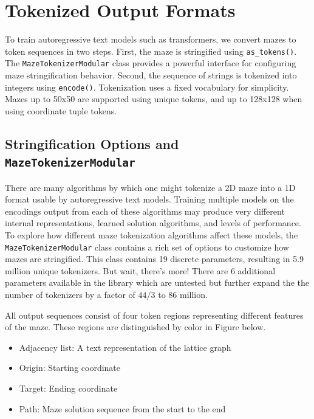 \documentclass[10pt,a4paper,onecolumn]{article}
\providecommand{\tightlist}{%
  \setlength{\itemsep}{0pt}\setlength{\parskip}{0pt}}
\begin{document}
\hypertarget{tokenized-output-formats}{%
\section{Tokenized Output Formats}\label{tokenized-output-formats}}

To train autoregressive text models such as transformers, we convert
mazes to token sequences in two steps. First, the maze is stringified
using \texttt{as\_tokens()}. The \texttt{MazeTokenizerModular} class
provides a powerful interface for configuring maze stringification
behavior. Second, the sequence of strings is tokenized into integers
using \texttt{encode()}. Tokenization uses a fixed vocabulary for
simplicity. Mazes up to 50x50 are supported using unique tokens, and up
to 128x128 when using coordinate tuple tokens.

\hypertarget{mtm}{%
\subsection{\texorpdfstring{Stringification Options and
\texttt{MazeTokenizerModular}}{Stringification Options and MazeTokenizerModular}}\label{mtm}}

There are many algorithms by which one might tokenize a 2D maze into a
1D format usable by autoregressive text models. Training multiple models
on the encodings output from each of these algorithms may produce very
different internal representations, learned solution algorithms, and
levels of performance. To explore how different maze tokenization
algorithms affect these models, the \texttt{MazeTokenizerModular} class
contains a rich set of options to customize how mazes are stringified.
This class contains 19 discrete parameters, resulting in 5.9 million
unique tokenizers. But wait, there's more! There are 6 additional
parameters available in the library which are untested but further
expand the the number of tokenizers by a factor of \(44/3\) to 86
million.

All output sequences consist of four token regions representing
different features of the maze. These regions are distinguished by color
in Figure below.

\begin{itemize}
\tightlist
\item
  {Adjacency list}: A text representation of the lattice graph
\item
  {Origin}: Starting coordinate
\item
  {Target}: Ending coordinate
\item
  {Path}: Maze solution sequence from the start to the end
\end{itemize}
\end{document}
